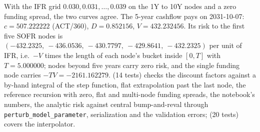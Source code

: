 \documentclass[10pt]{article}
\newcommand{\code}[1]{\texttt{#1}}
\begin{document}
With the IFR grid $0.030,0.031,\dots,0.039$ on the 1Y to 10Y nodes and a zero funding spread, the two curves agree. The 5-year cashflow pays
on 2031-10-07: $c=507.222222$ (ACT/360), $D=0.852156$, $V=432.232456$. Its
risk to the first five SOFR nodes is $(-432.2325,\ -436.0536,\ -430.7797,\ -429.8641,\ -432.2325)$ per unit of IFR, i.e.\ $-V$ times the length of each node's bucket inside
$[0,T]$ with $T=5.000000$; nodes beyond five years carry zero risk, and the single funding node carries $-TV=-2161.162279$.
 (14 tests) checks the discount factors against a by-hand integral of the step function, flat
extrapolation past the last node, the reference recursion with zero, flat and multi-node funding spreads, the notebook's numbers, the analytic
risk against central bump-and-reval through \code{perturb\_model\_parameter}, serialization and the validation errors;
 (20 tests) covers the interpolator.
\end{document}
